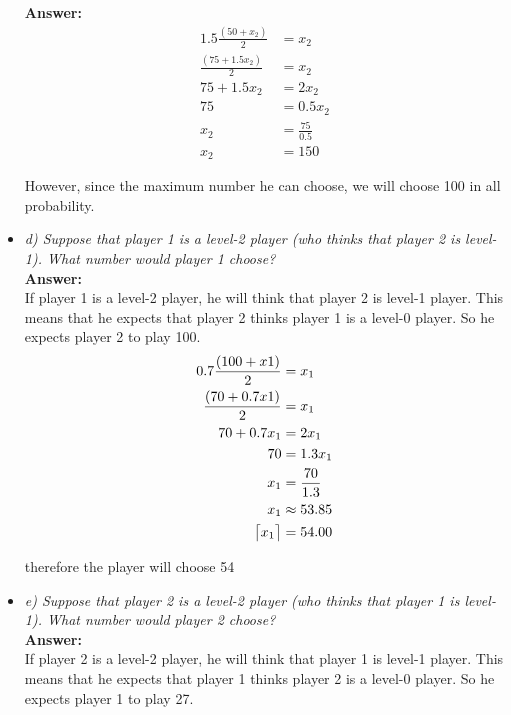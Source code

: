 \documentclass{report}
\DeclarePairedDelimiter{\ceil}{\lceil}{\rceil}
\begin{document}
\begin{itemize}
\textbf{Answer:}\\

\begin{align*} 
1.5 \frac{(50 + x_2)}{2} &= x_2\\
\frac{(75 + 1.5x_2)}{2} &= x_2\\
75 + 1.5x_2 &= 2x_2\\
75 &= 0.5x_2\\
x_2 &= \frac{75}{0.5}\\
x_2 &= 150
\end{align*}

However, since the maximum number he can choose, we will choose 100 in all probability.\\
    
    
    \item[]\textit{d) Suppose that player 1 is a level-2 player (who thinks that player 2 is level-1). What number would player 1 choose?}\\

\textbf{Answer:}\\    
    
If player 1 is a level-2 player, he will think that player 2 is level-1 player. This means that he expects that player 2 thinks player 1 is a level-0 player. So he expects player 2 to play 100.\\
    
    \begin{align*} 
0.7 \frac{(100+ x1)}{2} &= x_1\\
\frac{(70 + 0.7x1)}{2} &= x_1\\
70 + 0.7x_1 &= 2x_1\\
70 &= 1.3x_1\\
x_1 &= \frac{70}{1.3}\\
x_1&\approx53.85 \\
\ceil[\big]{x_1}&=54.00
\end{align*}

therefore the player will choose 54\\
    
    
    \item[]\textit{e) Suppose that player 2 is a level-2 player (who thinks that player 1 is level-1). What number would player 2 choose?}\\

\textbf{Answer:}\\

If player 2 is a level-2 player, he will think that player 1 is level-1 player. This means that he expects that player 1 thinks player 2 is a level-0 player. So he expects player 1 to play 27.\\
    

\end{itemize}
\end{document}
